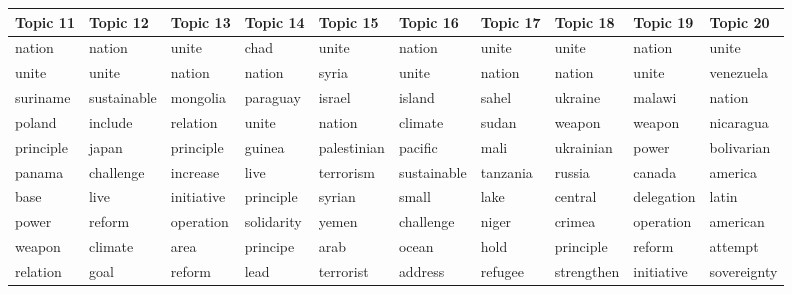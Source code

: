 \begin{table}[ht!]
{\begin{tabular}{llllllllll}
			\toprule
				Topic 11 & Topic 12 & Topic 13 & Topic 14 & Topic 15 & Topic 16 & Topic 17 & Topic 18 & Topic 19 & Topic 20 \\
			\midrule
				nation & nation & unite & chad & unite & nation & unite & unite & nation & unite \\
				unite & unite & nation & nation & syria & unite & nation & nation & unite & venezuela \\
				suriname & sustainable & mongolia & paraguay & israel & island & sahel & ukraine & malawi & nation \\
				poland & include & relation & unite & nation & climate & sudan & weapon & weapon & nicaragua \\
				principle & japan & principle & guinea & palestinian & pacific & mali & ukrainian & power & bolivarian \\
				panama & challenge & increase & live & terrorism & sustainable & tanzania & russia & canada & america \\
				base & live & initiative & principle & syrian & small & lake & central & delegation & latin \\
				power & reform & operation & solidarity & yemen & challenge & niger & crimea & operation & american \\
				weapon & climate & area & principe & arab & ocean & hold & principle & reform & attempt \\
				relation & goal & reform & lead & terrorist & address & refugee & strengthen & initiative & sovereignty \\
			\bottomrule
        

\end{tabular}}
\end{table}
